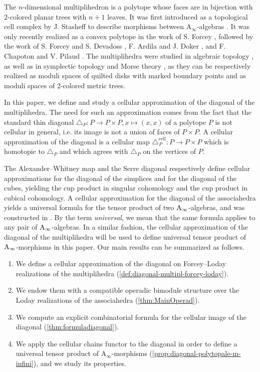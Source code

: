 \documentclass[twoside, 11pt]{amsart}
\theoremstyle{remark}
\begin{document}
The $n$-dimensional multiplihedron is a polytope whose faces are in bijection with 2-colored planar trees with $n+1$ leaves. It was first introduced as a topological cell complex by J. Stasheff to describe morphisms between $\mathrm{A}_\infty$-algebras \cite{Stasheff70}.
It was only recently realized as a convex polytope in the work of S. Forcey \cite{Forcey08}, followed by the work of S. Forcey and S. Devadoss \cite{DevadossForcey08}, F. Ardila and J. Doker \cite{AD13}, and F. Chapoton and V. Pilaud \cite{CP22}.
The multiplihedra were studied in algebraic topology \cite{BoardmanVogt73}, as well as in symplectic topology \cite{MauWoodward10,mau-wehrheim-woodward} and Morse theory \cite{mazuir-I,mazuir-II}, as they can be respectively realized as moduli spaces of quilted disks with marked boundary points and as moduli spaces of 2-colored metric trees. 

In this paper, we define and study a cellular approximation of the diagonal of the multiplihedra. 
The need for such an approximation comes from the fact that the standard thin diagonal $\triangle_P:P\to P\times P, x\mapsto (x,x)$ of a polytope $P$ is not cellular in general, i.e. its image is not a union of faces of $P\times P$. 
A cellular approximation of the diagonal is a cellular map $\triangle_P^{\textrm{cell}} : P \to P\times P$ which is homotopic to $\triangle_P$ and which agrees with $\triangle_P$ on the vertices of $P$.

The Alexander--Whitney map \cite{EilenbergMacLane53} and the Serre diagonal \cite{Serre51} respectively define cellular approximations for the diagonal of the simplices and for the diagonal of the cubes, yielding the cup product in singular cohomology and the cup product in cubical cohomology.
A cellular approximation for the diagonal of the associahedra yields a universal formula for the tensor product of two $\mathrm{A}_\infty$-algebras, and was constructed in \cite{SaneblidzeUmble04,MarklShnider06,MTTV19}. 
By the term \textit{universal}, we mean that the same formula applies to any pair of $\mathrm{A}_\infty$-algebras.
In a similar fashion, the cellular approximation of the diagonal of the multiplihedra will be used to define universal tensor product of $\mathrm{A}_\infty$-morphisms in this paper.
Our main results can be summarized as follows.
\begin{enumerate}
  \item We define a cellular approximation of the diagonal on Forcey--Loday realizations of the multiplihedra (\cref{def:diagonal-multipl-forcey-loday}).
  \item We endow them with a compatible operadic bimodule structure over the Loday realizations of the associahedra (\cref{thm:MainOperad}).
  \item We compute an explicit combinatorial formula for the cellular image of the diagonal (\cref{thm:formuladiagonal}).
  \item We apply the cellular chains functor to the diagonal in order to define a universal tensor product of $\mathrm{A}_\infty$-morphisms (\cref{prop:diagonal-polytopale-m-infini}), and we study its properties.
\end{enumerate}
\end{document}

